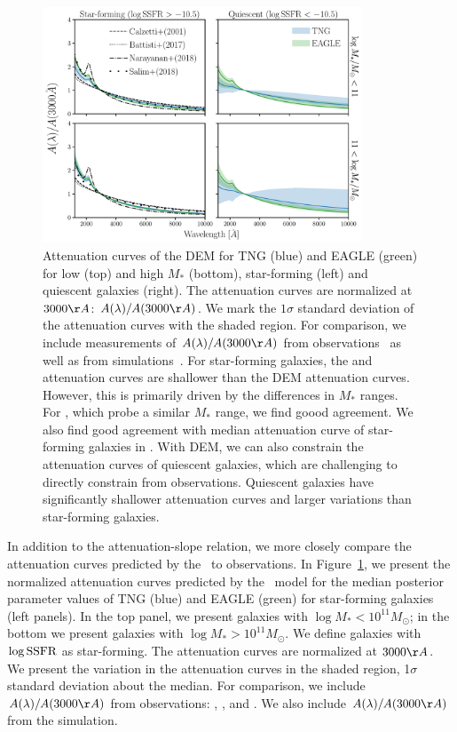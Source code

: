 \begin{figure}
\begin{center}
    \includegraphics[width=0.85\textwidth]{figs/abc_attenuation.pdf}
    \caption{\label{fig:atten}
    Attenuation curves of the DEM for TNG (blue) and EAGLE (green) for 
    low (top) and high $M_*$ (bottom), star-forming (left) and
    quiescent galaxies (right). The attenuation curves are normalized at
    $3000\AA$: $A(\lambda)/A(3000\AA)$. We mark the $1\sigma$ standard
    deviation of the attenuation curves with the shaded region. For comparison,
    we include measurements of $A(\lambda)/A(3000\AA)$ from 
    observations~\citep{calzetti2000, battisti2017, salim2018} as well as
    from simulations~\citep{narayanan2018}. For star-forming galaxies, the 
    \cite{calzetti2000} and \cite{battisti2017} attenuation curves are shallower 
    than the DEM attenuation curves. However, this is primarily driven by the
    differences in $M_*$ ranges. For \cite{salim2018}, which probe a similar
    $M_*$ range, we find goood agreement. We also find good agreement with 
    median attenuation curve of star-forming galaxies in \cite{narayanan2018}.
    With DEM, we can also constrain the attenuation curves of quiescent galaxies,
    which are challenging to directly constrain from observations. Quiescent 
    galaxies have significantly shallower attenuation curves and larger
    variations than star-forming galaxies. 
    }
\end{center}
\end{figure}

In addition to the attenuation-slope relation, we more closely compare the
attenuation curves predicted by the \eda~to observations. In
Figure~\ref{fig:atten}, we present the normalized attenuation curves predicted
by the \eda~model for the median posterior parameter values of TNG (blue) and
EAGLE (green) for star-forming galaxies (left panels). In the top panel, we
present galaxies with $\log M_* < 10^{11} M_\odot$; in the bottom we present 
galaxies with $\log M_* > 10^{11} M_\odot$. We define galaxies with 
$\log {\rm SSFR}$ as star-forming. The attenuation curves are normalized at
$3000\AA$. We present the variation in the attenuation curves in the shaded
region, 1$\sigma$ standard deviation about the median. For comparison,
we include $A(\lambda)/A(3000\AA)$ from observations: \cite{calzetti2000},
\cite{battisti2017}, and \cite{salim2018}. We also include $A(\lambda)/A(3000\AA)$
from the \cite{narayanan2018} simulation. 

